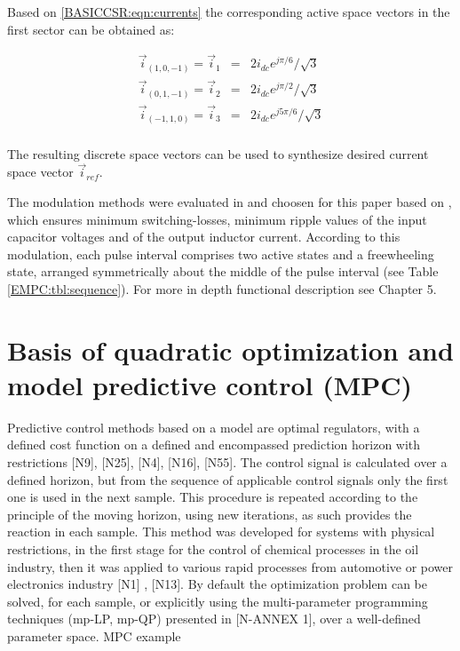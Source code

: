 		Based on \ref{BASICCSR:eqn:currents} the corresponding active space vectors in the first sector can be obtained as:
		
		\begin{equation}
        \begin{array}{rcl}
            \vec{i}_{(1,0,-1)}=\vec{i}_1&=&2i_{dc}e^{j\pi/6}/\sqrt{3}\\
						\vec{i}_{(0,1,-1)}=\vec{i}_2&=&2i_{dc}e^{j\pi/2}/\sqrt{3}\\
						\vec{i}_{(-1,1,0)}=\vec{i}_3&=&2i_{dc}e^{j5\pi/6}/\sqrt{3}\\
        \end{array}
        \label{BASICCSR:eqn:currents}
    \end{equation}
		
		The resulting discrete space vectors can be used to synthesize desired current
space vector $\vec{i}_{ref}$. 

The modulation methods were evaluated in and choosen for this paper based on \cite{moussaoui2005open}, which ensures minimum switching-losses, minimum ripple values of the input capacitor voltages and of the output inductor current. According to this modulation, each pulse interval comprises two active states and a freewheeling state, arranged symmetrically about the middle of the pulse interval (see Table \ref{EMPC:tbl:sequence}). For more in depth functional description see Chapter 5.

\section{Basis of quadratic optimization and model predictive control (MPC)}
	
	Predictive control methods based on a model are optimal regulators, with a defined cost function on a defined and encompassed  	prediction horizon with restrictions [N9], [N25], [N4], [N16], [N55]. The control signal is calculated over a defined horizon, but from the sequence of applicable control signals only the first one is used in the next sample. This procedure is repeated according to the principle of the moving horizon, using new iterations, as such provides the reaction in each sample. This method was developed for systems with physical restrictions, in the first stage for the control of chemical processes in the oil industry, then it was applied to various rapid processes from automotive or power electronics industry [N1] , [N13]. By default the optimization problem can be solved, for each sample, or explicitly using the multi-parameter programming techniques (mp-LP, mp-QP) presented in [N-ANNEX 1], over a well-defined parameter space.
	MPC example
	

